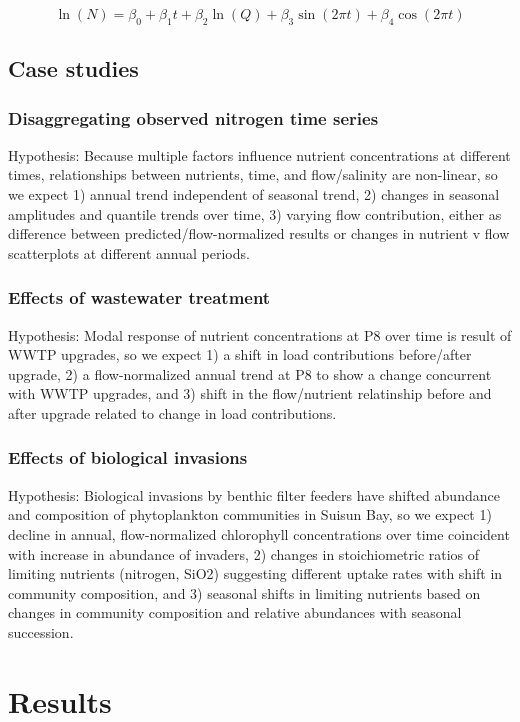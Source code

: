 \documentclass[letterpaper,12pt,oneside]{article}\usepackage[]{graphicx}\usepackage[]{color}
\begin{document}
\begin{equation}
\ln\left(N\right) = \beta_0 + \beta_1 t + \beta_2 \ln\left(Q\right) + \beta_3 \sin\left(2\pi t\right) + \beta_4 \cos\left(2\pi t\right)
\end{equation}

\subsection{Case studies}
\subsubsection{Disaggregating observed nitrogen time series}
Hypothesis: Because multiple factors influence nutrient concentrations at different times, relationships between nutrients, time, and flow/salinity are non-linear, so we expect 1) annual trend independent of seasonal trend, 2) changes in seasonal amplitudes and quantile trends over time, 3) varying flow contribution, either as difference between predicted/flow-normalized results or changes in nutrient v flow scatterplots at different annual periods.
\subsubsection{Effects of wastewater treatment}
Hypothesis: Modal response of nutrient concentrations at P8 over time is result of WWTP upgrades, so we expect 1) a shift in load contributions before/after upgrade, 2) a flow-normalized annual trend at P8 to show a change concurrent with WWTP upgrades, and 3) shift in the flow/nutrient relatinship before and after upgrade related to change in load contributions.
\subsubsection{Effects of biological invasions}
Hypothesis: Biological invasions by benthic filter feeders have shifted abundance and composition of phytoplankton communities in Suisun Bay, so we expect 1) decline in annual, flow-normalized chlorophyll concentrations over time coincident with increase in abundance of invaders, 2) changes in stoichiometric ratios of limiting nutrients (nitrogen, SiO2) suggesting different uptake rates with shift in community composition, and 3) seasonal shifts in limiting nutrients based on changes in community composition and relative abundances with seasonal succession.

\section{Results}
\end{document}
